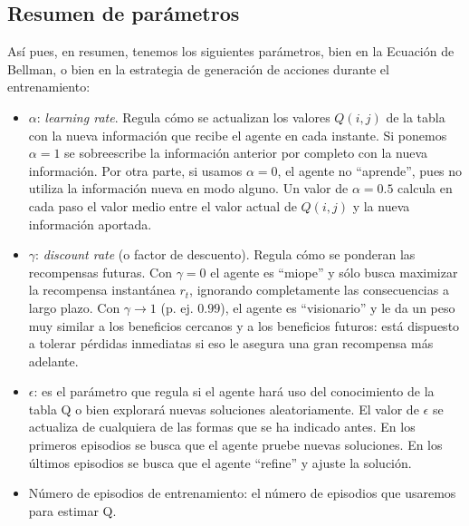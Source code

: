 \documentclass{article}
\begin{document}
\subsection{Resumen de parámetros}
Así pues, en resumen, tenemos los siguientes parámetros, bien en la Ecuación de Bellman, o bien en la estrategia de generación de acciones durante el entrenamiento:
\begin{itemize}
    \item $\alpha$: \textit{learning rate}. Regula cómo se actualizan los valores $Q(i,j)$ de la tabla con la nueva información que recibe el agente en cada instante. Si ponemos $\alpha=1$ se sobreescribe la información anterior por completo con la nueva información. Por otra parte, si usamos $\alpha=0$, el agente no ``aprende'', pues no utiliza la información nueva en modo alguno. Un valor de $\alpha=0.5$ calcula en cada paso el valor medio entre el valor actual de $Q(i,j)$ y la nueva información aportada.
    \item $\gamma$: \textit{discount rate} (o factor de descuento). Regula cómo se ponderan las recompensas futuras. Con $\gamma = 0$ el agente es ``miope'' y sólo busca maximizar la recompensa instantánea $r_t$, ignorando completamente las consecuencias a largo plazo. Con $\gamma \to 1$ (p. ej. $0.99$), el agente es ``visionario'' y le da un peso muy similar a los beneficios cercanos y a los beneficios futuros: está dispuesto a tolerar pérdidas inmediatas si eso le asegura una gran recompensa más adelante.
    \item $\epsilon$: es el parámetro que regula si el agente hará uso del conocimiento de la tabla Q o bien explorará nuevas soluciones aleatoriamente. El valor de $\epsilon$ se actualiza de cualquiera de las formas que se ha indicado antes. En los primeros episodios se busca que el agente pruebe nuevas soluciones. En los últimos episodios se busca que el agente ``refine'' y ajuste la solución.
    \item Número de episodios de entrenamiento: el número de episodios que usaremos para estimar Q. 
\end{itemize}
\end{document}
